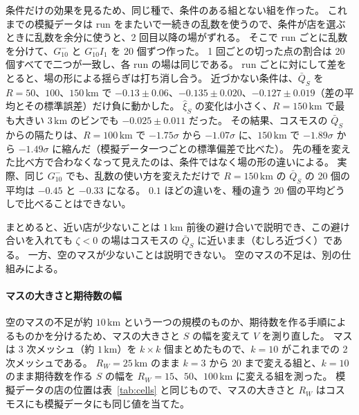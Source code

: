 \documentclass[a4paper,11pt]{ltjsarticle}
\begin{document}
条件だけの効果を見るため、同じ種で、条件のある組とない組を作った。
これまでの模擬データは run をまたいで一続きの乱数を使うので、条件が店を選ぶときに乱数を余分に使うと、2 回目以降の場がずれる。
そこで run ごとに乱数を分けて、$G_{10}^{-}$ と $G_{10}^{-}I_1$ を 20 個ずつ作った。
1 回ごとの切った点の割合は 20 個すべてで二つが一致し、各 run の場は同じである。
run ごとに対にして差をとると、場の形による揺らぎは打ち消し合う。
近づかない条件は、$\bar Q_S$ を $R = 50$、$100$、$150\,\mathrm{km}$ で $-0.13 \pm 0.06$、$-0.135 \pm 0.020$、$-0.127 \pm 0.019$（差の平均とその標準誤差）だけ負に動かした。
$\hat\xi_S$ の変化は小さく、$R = 150\,\mathrm{km}$ で最も大きい $3\,\mathrm{km}$ のビンでも $-0.025 \pm 0.011$ だった。
その結果、コスモスの $\bar Q_S$ からの隔たりは、$R = 100\,\mathrm{km}$ で $-1.75\sigma$ から $-1.07\sigma$ に、$150\,\mathrm{km}$ で $-1.89\sigma$ から $-1.49\sigma$ に縮んだ（模擬データ一つごとの標準偏差で比べた）。
先の種を変えた比べ方で合わなくなって見えたのは、条件ではなく場の形の違いによる。
実際、同じ $G_{10}^{-}$ でも、乱数の使い方を変えただけで $R = 150\,\mathrm{km}$ の $\bar Q_S$ の 20 個の平均は $-0.45$ と $-0.33$ になる。
$0.1$ ほどの違いを、種の違う 20 個の平均どうしで比べることはできない。

まとめると、近い店が少ないことは $1\,\mathrm{km}$ 前後の避け合いで説明でき、この避け合いを入れても $\zeta < 0$ の場はコスモスの $\bar Q_S$ に近いまま（むしろ近づく）である。
一方、空のマスが少ないことは説明できない。
空のマスの不足は、別の仕組みによる。

\begin{table}[t]
  \centering
  \caption{自分以外で最も近い店までの距離 $d$ の統計。$G(x)$ は $d < x\,\mathrm{km}$ の店の割合、$d_{90}$ は $d$ の $90\%$ 点 [km]、$F_{\ge 3}(0.1)$ は $\lambda_c \ge 3$ のマスにいる店のうち $u = \pi n_c d^2 < 0.1$ の割合。
    模擬データは表~\ref{tab:cells} と同じ店の位置（各 20 個）。$G_{10}^{-}I_1$ は $G_{10}^{-}$ に近づかない条件（$r = 1\,\mathrm{km}$、$\gamma = 0.5$）を足したもの、$hI_1$ は場を持たず人口への反応と同じ条件だけを持つもの（\ref{sec:catchment} 節）、$hI_1'$ はそれを別の乱数の種で作り直したもの。
    模擬データは平均 $\pm$ 標準偏差で、括弧の中は（コスモス $-$ 平均）/ 標準偏差。}
  \label{tab:nearest}
  \footnotesize
  \setlength{\tabcolsep}{3pt}
  
\end{table}

\paragraph{マスの大きさと期待数の幅}
\label{sec:cell-scale}
空のマスの不足が約 $10\,\mathrm{km}$ という一つの規模のものか、期待数を作る手順によるものかを分けるため、マスの大きさと $S$ の幅を変えて $V$ を測り直した。
マスは 3 次メッシュ（約 $1\,\mathrm{km}$）を $k \times k$ 個まとめたもので、$k = 10$ がこれまでの 2 次メッシュである。
$R_W = 25\,\mathrm{km}$ のまま $k = 3$ から $20$ まで変える組と、$k = 10$ のまま期待数を作る $S$ の幅を $R_W = 15$、$50$、$100\,\mathrm{km}$ に変える組を測った。
模擬データの店の位置は表~\ref{tab:cells} と同じもので、マスの大きさと $R_W$ はコスモスにも模擬データにも同じ値を当てた。
\end{document}
